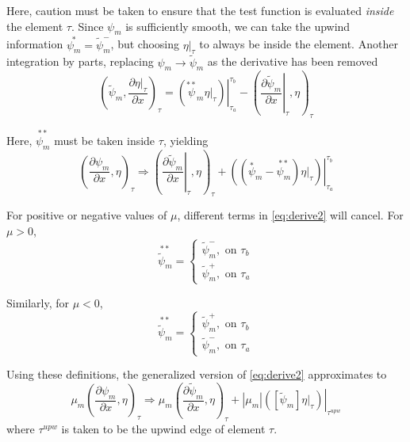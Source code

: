 \documentclass{article}
\newcommand{\pdiff}[2]{\frac{\partial#1}{\partial#2}}
\newcommand{\ddx}[1]{\pdiff{#1}{x}}
\newcommand{\dpmdx}{\ddx{\psi_m}}
\newcommand{\fepsim}{\tilde{\psi}_m}
\newcommand{\dfpmdx}{\ddx{\fepsim}}
\newcommand{\innerProd}[2]{\left(#1,#2\right)}
\newcommand{\tauInt}[2]{\innerProd{#1}{#2}_\tau}
\newcommand{\inTau}[1]{\left.#1\right\vert_{\tau}}
\newcommand{\fepsimp}{\fepsim^+}
\newcommand{\fepsimm}{\fepsim^-}
\newcommand{\mabs}[1]{\left|#1\right|}
\newcommand{\jump}[1]{\left[#1\right]}
\begin{document}
Here, caution must be taken to ensure that the test function is evaluated \textit{inside} the
element $\tau$.
Since $\psi_m$ is sufficiently smooth, we can take the upwind information $\overset{*}{\psi_m}=\fepsim^-$,
but choosing $\inTau{\eta}$ to always be inside the element.
Another integration by parts, replacing $\psi_m\rightarrow\fepsim$ as the derivative has been removed
\begin{equation}
    \label{eq:derive1}
    \tauInt{\fepsim}{\ddx{\inTau{\eta}}}=\left.\left(
        \overset{**}\psi_m\inTau{\eta}
    \right)\right|_{\tau_a}^{\tau_b}
    -\tauInt{\inTau{\ddx{\fepsim}}}{\eta}
\end{equation}

Here, $\overset{**}{\psi_m}$ must be taken inside $\tau$, yielding
\begin{equation}
    \label{eq:derive2}
    \tauInt{\dpmdx}{\eta}\Rightarrow
        \tauInt{\inTau{\ddx{\fepsim}}}{\eta}
        + \left.\left(\left(\overset{*}\psi_m-\overset{**}{\psi_m}\right)\inTau{\eta}\right)
        \right\vert_{\tau_a}^{\tau_b}
\end{equation}

For positive or negative values of $\mu$, different terms in \cref{eq:derive2} will cancel.
For $\mu>0$, 
\begin{equation}
    \overset{**}{\fepsim} = 
    \begin{cases}
        \fepsimm, \text{ on }\tau_b \\
        \fepsimp, \text{ on }\tau_a
    \end{cases}
\end{equation}

Similarly, for $\mu<0$,
\begin{equation}
    \overset{**}{\fepsim} = 
    \begin{cases}
        \fepsimp, \text{ on }\tau_b \\
        \fepsimm, \text{ on }\tau_a
    \end{cases}
\end{equation}

Using these definitions, the generalized version of \cref{eq:derive2} approximates to 
\begin{equation}
    \label{eq:derive3}
    \mu_m\tauInt{\dpmdx}{\eta}\Rightarrow\mu_m\tauInt{\dfpmdx}{\eta}
    + \mabs{\mu_m}\left.\left(\jump{\fepsim}\inTau{\eta}\right)\right|_{\tau^{upw}}
\end{equation}
where $\tau^{upw}$ is taken to be the upwind edge of element $\tau$.
\end{document}
